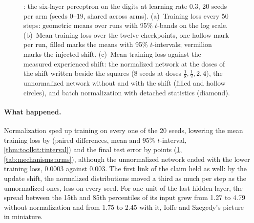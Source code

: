 \begin{refsection}
\begin{figure}[t]
\begin{fullwidth}

\smallskip
{}
\caption{: the six-layer perceptron on the digits at learning rate $0.3$, 20 seeds per arm (seeds $0$--$19$, shared across arms). (a)~Training loss every 50 steps: geometric means over runs with 95\% $t$-bands on the log scale. (b)~Mean training loss over the twelve checkpoints, one hollow mark per run, filled marks the means with 95\% $t$-intervals; vermilion marks the injected shift. (c)~Mean training loss against the measured experienced shift: the normalized network at the doses of the shift written beside the squares (8 seeds at doses $\frac18,\frac12,2,4$), the unnormalized network without and with the shift (filled and hollow circles), and batch normalization with detached statistics (diamond).}
\label{fig:mechanisms:noisybn}
\end{fullwidth}
\end{figure}

\paragraph{What happened.} Normalization sped up training on every one of the 20 seeds, lowering the mean training loss by  (paired differences, mean and 95\% $t$-interval, \cref{thm:toolkit:tinterval}) and the final test error by  points (\cref{fig:mechanisms:noisybn}, \cref{tab:mechanisms:arms}), although the unnormalized network ended with the lower training loss, 0.0003 against 0.003. The first link of the claim held as well: by the update shift, the normalized distributions moved a third as much per step as the unnormalized ones, less on every seed. For one unit of the last hidden layer, the spread between the 15th and 85th percentiles of its input grew from 1.27 to 4.79 without normalization and from 1.75 to 2.45 with it, Ioffe and Szegedy's picture in miniature.


\end{refsection}
